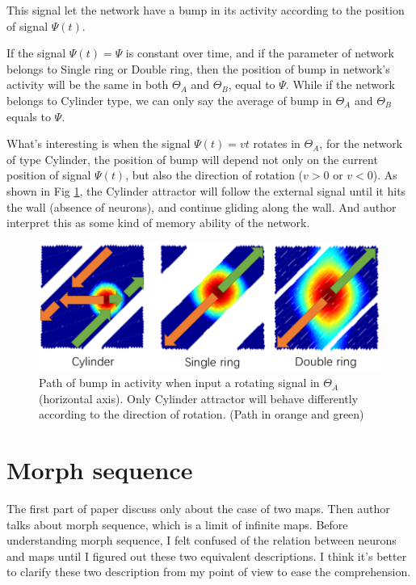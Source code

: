 \documentclass{article}
\begin{document}
	This signal let the network have a bump in its activity according to the position of signal $\Psi(t)$. 
	
	If the signal $\Psi(t)=\Psi$ is constant over time, and if the parameter of network belongs to Single ring or Double ring, then the position of bump in network's activity will be the same in both $\Theta_A$ and $\Theta_B$, equal to $\Psi$. While if the network belongs to Cylinder type, we can only say the average of bump in $\Theta_A$ and $\Theta_B$ equals to $\Psi$.
	
	What's interesting is when the signal $\Psi(t)=vt$ rotates in $\Theta_A$, for the network of type Cylinder, the position of bump will depend not only on the current position of signal $\Psi(t)$, but also the direction of rotation ($v>0$ or $v<0$). As shown in Fig \ref{fig:moving}, the Cylinder attractor will follow the external signal until it hits the wall (absence of neurons), and continue gliding along the wall. And author interpret this as some kind of memory ability of the network.
	
	\begin{figure}[h]
		\centering
		\includegraphics[width=12cm]{moving.png}
		\caption{Path of bump in activity when input a rotating signal in $\Theta_A$ (horizontal axis). Only Cylinder attractor will behave differently according to the direction of rotation. (Path in orange and green)}
		\label{fig:moving}
	\end{figure}

	\section{Morph sequence}
	The first part of paper discuss only about the case of two maps. Then author talks about morph sequence, which is a limit of infinite maps. Before understanding morph sequence, I felt confused of the relation between neurons and maps until I figured out these two equivalent descriptions. I think it's better to clarify these two description from my point of view to ease the comprehension.
	
\end{document}
